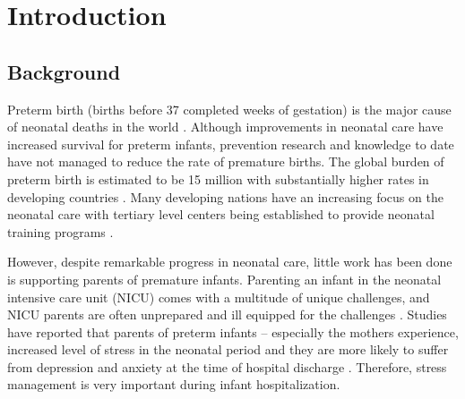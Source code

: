 

\chapter{Introduction} %

\label{Chapter1} %


\newcommand{\keyword}[1]{\textbf{#1}}
\newcommand{\tabhead}[1]{\textbf{#1}}
\newcommand{\code}[1]{\texttt{#1}}
\newcommand{\file}[1]{\texttt{\bfseries#1}}
\newcommand{\option}[1]{\texttt{\itshape#1}}


\section{Background}
Preterm birth (births before 37 completed weeks of gestation) is the major cause of neonatal deaths in the world \textcite{Arnold2013}. Although improvements in neonatal care have increased survival for preterm infants, prevention research and knowledge to date have not managed to reduce the rate of premature births. The global burden of preterm birth is estimated to be 15 million with substantially higher rates in developing countries \textcite{Steyn2017, Blencowe2013, Althabe2012}. Many developing nations  have an increasing focus on the neonatal care with tertiary level centers being established to provide neonatal training programs \textcite{Lloyd2013a, Enlow2017}. 

However, despite remarkable progress in neonatal care, little work has been done is supporting parents of premature infants. Parenting an infant in the neonatal intensive care unit (NICU) comes with a multitude of unique challenges, and NICU parents are often unprepared and ill equipped for the challenges \textcite{Howe2014}. Studies have reported that parents of preterm infants -- especially the mothers experience, increased level of stress in the neonatal period and they are more likely  to suffer from depression and anxiety at the time of hospital discharge \textcite{Guillaume2013, Wigert2014b, Heidari2017}. Therefore, stress management is very important during infant hospitalization. 


